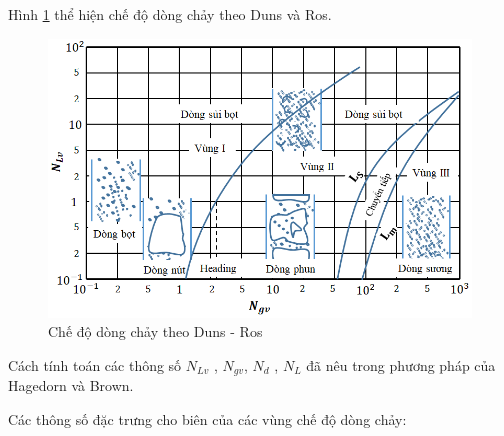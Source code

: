 \documentclass[12pt,a4paper]{report}
\begin{document}
Hình \ref{fig:Duns_and_Ros_flow_pattern} thể hiện chế độ dòng chảy theo Duns và Ros.
	\begin{figure}[h]
		\centering
		\includegraphics[scale=0.7]{Fig/Duns_and_Ros_flow_pattern.png}
		\caption[Chế độ dòng chảy theo Duns - Ros]{Chế độ dòng chảy theo Duns - Ros \cite{brill1999multiphase}}
		\label{fig:Duns_and_Ros_flow_pattern}
	\end{figure}
Cách tính toán các thông số  $N_{Lv}$ , $N_{gv}$, $N_{d}$ , $N_{L}$  đã nêu trong phương pháp của Hagedorn và Brown.

Các thông số đặc trưng cho biên của các vùng chế độ dòng chảy:
\end{document}
